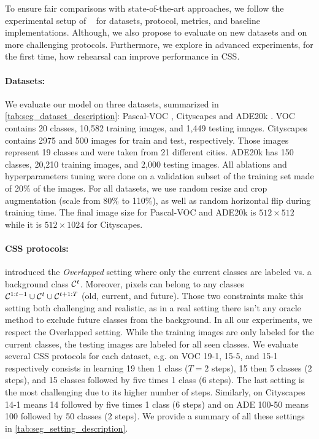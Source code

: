To ensure fair comparisons with state-of-the-art approaches, we follow the experimental setup of
~\cite{cermelli2020modelingthebackground} for datasets, protocol, metrics, and baseline
implementations. Although, we also propose to evaluate on new datasets and on more challenging
protocols. Furthermore, we explore in advanced experiments, for the first time, how rehearsal can
improve performance in \ac{CSS}.

\paragraph{Datasets:} We evaluate our model on three datasets, summarized in
\autoref{tab:seg_dataset_description}: Pascal-VOC \citep{everingham2015pascalvoc},
Cityscapes \citep{cordts2016cityscapes} and ADE20k \citep{zhou2017adedataset}. VOC contains 20
classes, 10,582 training images, and 1,449 testing images. Cityscapes contains 2975 and 500 images
for train and test, respectively. Those images represent 19 classes and were taken from 21 different
cities. ADE20k has 150 classes, 20,210 training images, and 2,000 testing images. All ablations and
hyperparameters tuning were done on a validation subset of the training set made of 20\% of the
images. For all datasets, we use random resize and crop augmentation (scale from 80\% to 110\%), as
well as random horizontal flip during training time. The final image size for Pascal-VOC and ADE20k
is $512 \times 512$ while it is $512 \times 1024$ for Cityscapes.

\paragraph{CSS protocols:} \cite{cermelli2020modelingthebackground} introduced the
\textit{Overlapped} setting where only the current classes are labeled vs. a background class
$\mathcal{C}^t$. Moreover, pixels can belong to any classes $\mathcal{C}^{1:t-1} \cup \mathcal{C}^{t} \cup \mathcal{C}^{t+1:T}$
(old, current, and future). Those two constraints make this setting both challenging and realistic,
as in a real setting there isn't any oracle method to exclude future classes from the background. In
all our experiments, we respect the Overlapped setting. While the training images are only labeled
for the current classes, the testing images are labeled for all seen classes. We evaluate several
\ac{CSS} protocols for each dataset, e.g. on VOC 19-1, 15-5, and 15-1 respectively consists in learning
19 then 1 class ($T=2$ steps), 15 then 5 classes ($2$ steps), and 15 classes followed by five times
1 class ($6$ steps). The last setting is the most challenging due to its higher number of steps.
Similarly, on Cityscapes 14-1 means 14 followed by five times 1 class ($6$ steps) and on ADE 100-50
means 100 followed by 50 classes ($2$ steps). We provide a summary of all these settings in
\autoref{tab:seg_setting_description}.

